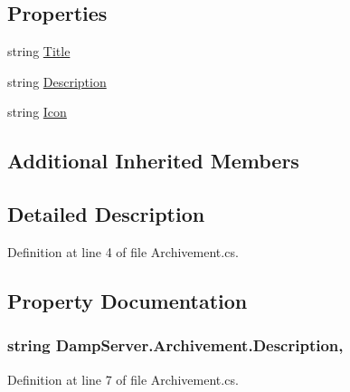 \subsection*{Properties}
\begin{DoxyCompactItemize}
\item 
string \hyperlink{class_damp_server_1_1_archivement_a5c6fe3aae5bf78863c252c2ca0ed9478}{Title}
\item 
string \hyperlink{class_damp_server_1_1_archivement_af79e40507c51c8e732dce9814b2f18e6}{Description}
\item 
string \hyperlink{class_damp_server_1_1_archivement_afdeb54a6032da7f51a86dd64ffc01a38}{Icon}
\end{DoxyCompactItemize}
\subsection*{Additional Inherited Members}


\subsection{Detailed Description}


Definition at line 4 of file Archivement.\-cs.



\subsection{Property Documentation}
\hypertarget{class_damp_server_1_1_archivement_af79e40507c51c8e732dce9814b2f18e6}{
\subsubsection[{Description}]{\setlength{\rightskip}{0pt plus 5cm}string Damp\-Server.\-Archivement.\-Description\hspace{0.3cm}{\ttfamily [get]}, {\ttfamily [set]}}}\label{class_damp_server_1_1_archivement_af79e40507c51c8e732dce9814b2f18e6}


Definition at line 7 of file Archivement.\-cs.

